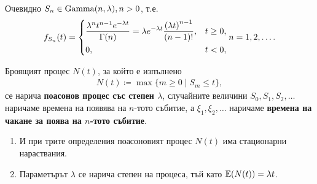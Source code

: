 \documentclass[numbers=endperiod, bibliography=totocnumbered]{scrartcl}
\begin{document}
\begin{definition}
\begin{enumerate}
    Очевидно \( S_n \in \operatorname{Gamma}(n, \lambda), n > 0 \), т.е.
    \begin{align*}
      f_{S_n}(t)
      =
      \begin{dcases}
        \frac {\lambda^n t^{n-1} e^{-\lambda t}} {\Gamma(n)} = \lambda e^{-\lambda t} \frac {{(\lambda t)}^{n-1}} {(n-1)!}, &t \geq 0, \\
        0, &t < 0,
      \end{dcases}
      n = 1, 2, \ldots.
    \end{align*}

    Броящият процес \( N(t) \), за който е изпълнено
    \begin{align*}
      N(t) \coloneqq \max \{ m \geq 0 \mid S_m \leq t \},
    \end{align*}
    се нарича \textbf{поасонов процес със степен \( \lambda \)}, случайните величини \( S_0, S_1, S_2, \ldots \) наричаме времена на появява на \( n \)-тото събитие, а \( \xi_1, \xi_2, \ldots \) наричаме \textbf{времена на чакане за поява на \( n \)-тото събитие}.
  \end{enumerate}
\end{definition}

\begin{note}
  \mbox{}
  \begin{enumerate}
    \item И при трите определения поасоновият процес \( N(t) \) има стационарни нараствания.
    \item Параметърът \( \lambda \) се нарича степен на процеса, тъй като \( \mathbb{E}(N(t)) = \lambda t \).
  \end{enumerate}
\end{note}
\end{document}
